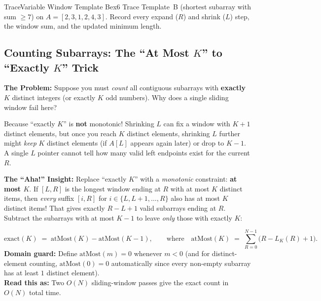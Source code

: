 \documentclass[11pt,a4paper]{article}
\theoremstyle{definition}
\newcommand{\painbeat}{\textbf{\color{accentamber}The Problem:} }
\newcommand{\ahabeat}{\textbf{\color{accentteal}The ``Aha!'' Insight:} }
\begin{document}
\begin{tryitbox}{Trace}{Variable Window Template B}{ex6}
Trace Template~B (shortest subarray with sum $\ge 7$) on $A = [2, 3, 1, 2, 4, 3]$. Record every expand ($R$) and shrink ($L$) step, the window sum, and the updated minimum length.
\end{tryitbox}

\subsection{Counting Subarrays: The ``At Most $K$'' to ``Exactly $K$'' Trick}

\painbeat Suppose you must \emph{count} all contiguous subarrays with \textbf{exactly} $K$ distinct integers (or exactly $K$ odd numbers). Why does a single sliding window fail here?

Because ``exactly $K$'' is \textbf{not} monotonic! Shrinking $L$ can fix a window with $K + 1$ distinct elements, but once you reach $K$ distinct elements, shrinking $L$ further might \emph{keep} $K$ distinct elements (if $A[L]$ appears again later) or drop to $K - 1$. A single $L$ pointer cannot tell how many valid left endpoints exist for the current $R$.

\ahabeat Replace ``exactly $K$'' with a \emph{monotonic} constraint: \textbf{at most $K$}. If $[L, R]$ is the longest window ending at $R$ with at most $K$ distinct items, then \emph{every} suffix $[i, R]$ for $i \in \{L, L+1, \dots, R\}$ also has at most $K$ distinct items! That gives exactly $R - L + 1$ valid subarrays ending at $R$. Subtract the subarrays with at most $K - 1$ to leave \emph{only} those with exactly $K$:

\begin{formulabox}
$$\text{exact}(K) \;=\; \text{atMost}(K) - \text{atMost}(K - 1), \qquad\text{where}\quad \text{atMost}(K) \;=\; \sum_{R=0}^{N-1} \bigl(R - L_K(R) + 1\bigr).$$
\textbf{Domain guard:} Define $\text{atMost}(m) = 0$ whenever $m < 0$ (and for distinct-element counting, $\text{atMost}(0) = 0$ automatically since every non-empty subarray has at least $1$ distinct element).\\
\textbf{Read this as:} Two $O(N)$ sliding-window passes give the exact count in $O(N)$ total time.
\end{formulabox}
\end{document}
